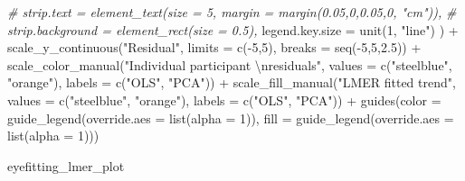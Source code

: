 \documentclass[print]{nuthesis}
\newenvironment{Shaded}{\begin{snugshade}}{\end{snugshade}}
\newcommand{\AttributeTok}[1]{\textcolor[rgb]{0.77,0.63,0.00}{#1}}
\newcommand{\CommentTok}[1]{\textcolor[rgb]{0.56,0.35,0.01}{\textit{#1}}}
\newcommand{\DecValTok}[1]{\textcolor[rgb]{0.00,0.00,0.81}{#1}}
\newcommand{\FloatTok}[1]{\textcolor[rgb]{0.00,0.00,0.81}{#1}}
\newcommand{\FunctionTok}[1]{\textcolor[rgb]{0.00,0.00,0.00}{#1}}
\newcommand{\NormalTok}[1]{#1}
\newcommand{\SpecialCharTok}[1]{\textcolor[rgb]{0.00,0.00,0.00}{#1}}
\newcommand{\StringTok}[1]{\textcolor[rgb]{0.31,0.60,0.02}{#1}}
\begin{document}
\begin{Shaded}
\begin{Highlighting}[]
        \CommentTok{\# strip.text = element\_text(size = 5, margin = margin(0.05,0,0.05,0, "cm")),}
        \CommentTok{\# strip.background = element\_rect(size = 0.5),}
        \AttributeTok{legend.key.size =} \FunctionTok{unit}\NormalTok{(}\DecValTok{1}\NormalTok{, }\StringTok{"line"}\NormalTok{)}
\NormalTok{        ) }\SpecialCharTok{+}
  \FunctionTok{scale\_y\_continuous}\NormalTok{(}\StringTok{"Residual"}\NormalTok{, }\AttributeTok{limits =} \FunctionTok{c}\NormalTok{(}\SpecialCharTok{{-}}\DecValTok{5}\NormalTok{,}\DecValTok{5}\NormalTok{), }\AttributeTok{breaks =} \FunctionTok{seq}\NormalTok{(}\SpecialCharTok{{-}}\DecValTok{5}\NormalTok{,}\DecValTok{5}\NormalTok{,}\FloatTok{2.5}\NormalTok{)) }\SpecialCharTok{+}
  \FunctionTok{scale\_color\_manual}\NormalTok{(}\StringTok{"Individual participant }\SpecialCharTok{\textbackslash{}n}\StringTok{residuals"}\NormalTok{, }\AttributeTok{values =} \FunctionTok{c}\NormalTok{(}\StringTok{"steelblue"}\NormalTok{, }\StringTok{"orange"}\NormalTok{), }\AttributeTok{labels =} \FunctionTok{c}\NormalTok{(}\StringTok{"OLS"}\NormalTok{, }\StringTok{"PCA"}\NormalTok{)) }\SpecialCharTok{+}
  \FunctionTok{scale\_fill\_manual}\NormalTok{(}\StringTok{"LMER fitted trend"}\NormalTok{, }\AttributeTok{values =} \FunctionTok{c}\NormalTok{(}\StringTok{"steelblue"}\NormalTok{, }\StringTok{"orange"}\NormalTok{), }\AttributeTok{labels =} \FunctionTok{c}\NormalTok{(}\StringTok{"OLS"}\NormalTok{, }\StringTok{"PCA"}\NormalTok{))  }\SpecialCharTok{+}
  \FunctionTok{guides}\NormalTok{(}\AttributeTok{color =} \FunctionTok{guide\_legend}\NormalTok{(}\AttributeTok{override.aes =} \FunctionTok{list}\NormalTok{(}\AttributeTok{alpha =} \DecValTok{1}\NormalTok{)),}
         \AttributeTok{fill =} \FunctionTok{guide\_legend}\NormalTok{(}\AttributeTok{override.aes =} \FunctionTok{list}\NormalTok{(}\AttributeTok{alpha =} \DecValTok{1}\NormalTok{)))}

\NormalTok{eyefitting\_lmer\_plot}
\end{Highlighting}
\end{Shaded}
\end{document}
